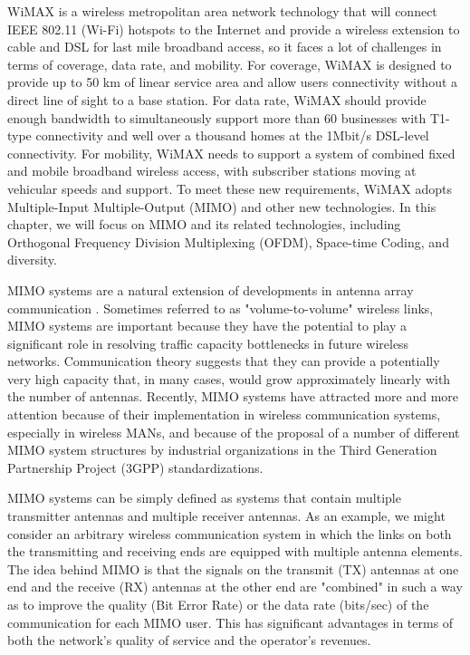 WiMAX is a wireless metropolitan area network technology that will
connect IEEE 802.11 (Wi-Fi) hotspots to the Internet and provide a
wireless extension to cable and DSL for last mile broadband access,
so it faces a lot of challenges in terms of coverage, data rate, and
mobility. For coverage, WiMAX is designed to provide up to 50 km of
linear service area and allow users connectivity without a direct
line of sight to a base station. For data rate, WiMAX should provide
enough bandwidth to simultaneously support more than 60 businesses
with T1-type connectivity and well over a thousand homes at the
1Mbit/s DSL-level connectivity. For mobility, WiMAX needs to support
a system of combined fixed and mobile broadband wireless access,
with subscriber stations moving at vehicular speeds and support. To
meet these new requirements, WiMAX adopts Multiple-Input
Multiple-Output (MIMO) and other new technologies. In this chapter,
we will focus on MIMO and its related technologies, including
Orthogonal Frequency Division Multiplexing (OFDM), Space-time
Coding, and diversity.

MIMO systems are a natural extension of developments in antenna
array communication \cite{1} \cite{2}. Sometimes referred to as
"volume-to-volume" wireless links, MIMO systems are important
because they have the potential to play a significant role in
resolving traffic capacity bottlenecks in future wireless networks.
Communication theory suggests that they can provide a potentially
very high capacity that, in many cases, would grow approximately
linearly with the number of antennas. Recently, MIMO systems have
attracted more and more attention because of their implementation in
wireless communication systems, especially in wireless MANs, and
because of the proposal of a number of different MIMO system
structures by industrial organizations in the Third Generation
Partnership Project (3GPP) standardizations.

MIMO systems can be simply defined as systems that contain multiple
transmitter antennas and multiple receiver antennas. As an example,
we might consider an arbitrary wireless communication system in
which the links on both the transmitting and receiving ends are
equipped with multiple antenna elements. The idea behind MIMO is
that the signals on the transmit (TX) antennas at one end and the
receive (RX) antennas at the other end are "combined" in such a way
as to improve the quality (Bit Error Rate) or the data rate
(bits/sec) of the communication for each MIMO user. This has
significant advantages in terms of both the network's quality of
service and the operator's revenues.

